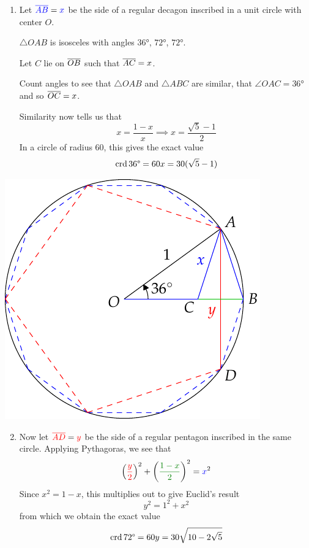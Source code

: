 \begin{minipage}[t]{0.55\linewidth}\vspace{0pt}
	\begin{enumerate}
	  \item Let $\textcolor{blue}{\cl{AB}}=\textcolor{blue}{x}$ be the side of a regular decagon inscribed in a unit circle with center $O$.\par
	  $\triangle OAB$ is isosceles with angles $\ang{36}$, $\ang{72}$, $\ang{72}$.\par
		Let $C$ lie on $\cl{OB}$ such that $\cl{AC}=x$.\par
		Count angles to see that $\triangle OAB$ and $\triangle ABC$ are similar, that $\angle OAC=\ang{36}$ and so $\cl{OC}=x$.\par
		Similarity now tells us that
		\[
			x=\frac{1-x}x\implies x=\dfrac{\sqrt 5-1}2
		\]
		In a circle of radius 60, this gives the exact value
	  \[
	  	\crd \ang{36}=60x=30(\sqrt 5-1)
	  \]
	  \end{enumerate}
\end{minipage}
\hfill
\begin{minipage}[t]{0.44\linewidth}\vspace{0pt}
	\flushright\includegraphics[scale=0.95]{pentagon}
\end{minipage}

\begin{enumerate}\setcounter{enumi}{1}
  \item Now let $\textcolor{red}{\cl{AD}}=\textcolor{red}{y}$ be the side of a regular pentagon inscribed in the same circle. Applying Pythagoras, we see that
  \[
  	\left(\textcolor{red}{\frac y2}\right)^2+\left(\textcolor{Green}{\frac{1-x}2}\right)^2=\textcolor{blue}{x}^2
  \]
  Since $x^2=1-x$, this multiplies out to give Euclid's result
  \[
  	y^2=1^2+x^2
  \]
  from which we obtain the exact value
  \[
  	\crd\ang{72}=60y=30\sqrt{10-2\sqrt 5}
  \]
\end{enumerate}
  
